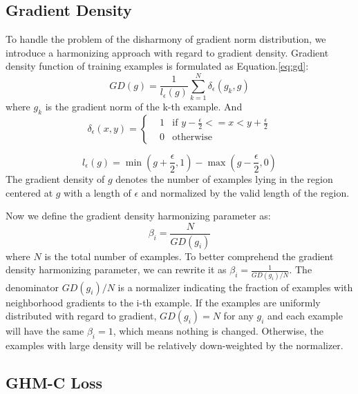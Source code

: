 \documentclass[letterpaper]{article} %
\begin{document}
\subsection{Gradient Density}

To handle the problem of the disharmony of gradient norm distribution, we introduce a harmonizing approach with regard to gradient density. Gradient density function of training examples is formulated as Equation.\ref{eq:gd}:
\begin{equation}
\label{eq:gd}
  GD(g) = \frac{1}{l_\epsilon(g)}\sum_{k=1}^N\delta_\epsilon(g_k, g)
\end{equation}
where $g_k$ is the gradient norm of the k-th example. And
\begin{equation}
  \delta_\epsilon(x, y) = \left\{
    \begin{aligned}
    & 1  & \text{if } y-\frac{\epsilon}{2} <= x < y+\frac{\epsilon}{2} \\
    & 0  & \text{otherwise}
    \end{aligned}
    \right.
\end{equation}

\begin{equation}
l_\epsilon(g) = \min(g+\frac{\epsilon}{2}, 1) - \max(g-\frac{\epsilon}{2}, 0)
\end{equation}
The gradient density of $g$ denotes the number of examples lying in the region centered at $g$ with a length of $\epsilon$ and normalized by the valid length of the region. 

Now we define the gradient density harmonizing parameter as:
\begin{equation}
\label{eq:beta}
  \beta_i = \frac{N}{GD(g_i)}
\end{equation}
where $N$ is the total number of examples. To better comprehend the gradient density harmonizing parameter, we can rewrite it as $\beta_i = \frac{1}{GD(g_i)/N}$. The denominator $GD(g_i)/N$ is a normalizer indicating the fraction of examples with neighborhood gradients to the i-th example. If the examples are uniformly distributed with regard to gradient, $GD(g_i) = N$ for any $g_i$ and each example will have the same $\beta_i = 1$, which means nothing is changed. Otherwise, the examples with large density will be relatively down-weighted by the normalizer.


\subsection{GHM-C Loss}
\end{document}
